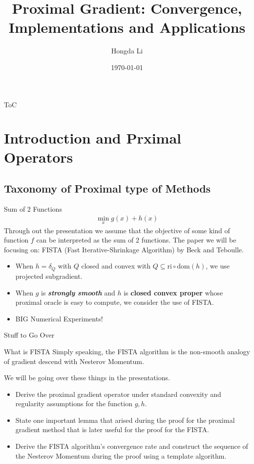 \documentclass[11pt]{beamer}
\author{Hongda Li}
\title{Proximal Gradient: Convergence, Implementations and Applications}
\institute[]{UBC Okanagan}
\date{\today}
\begin{document}
\begin{frame}
    \titlepage
\end{frame}

\begin{frame}{ToC}
    \tableofcontents
\end{frame}

\section{Introduction and Prximal Operators}
    \subsection{Taxonomy of Proximal type of Methods}
        \begin{frame}{Sum of 2 Functions}
            \begin{align}
                \min_{x} g(x) + h(x)
            \end{align}
            Through out the presentation we assume that the objective of some kind of function $f$ can be interpreted as the sum of 2 functions.
            The paper we will be focusing on: FISTA (Fast Iterative-Shrinkage Algorithm) by Beck and Teboulle. 
            \begin{itemize}
                \item [1.] When $h = \delta_Q$ with $Q$ closed and convex with $Q\subseteq \text{ri}\circ \text{dom}(h)$, we use projected subgradient. 
                \item [2.] When $g$ is \textbf{\emph{strongly smooth}} and $h$ is \textbf{closed convex proper} whose proximal oracle is easy to compute, we consider the use of FISTA. 
                \item [3.] BIG Numerical Experiments!
            \end{itemize}
        \end{frame}
        \begin{frame}{Stuff to Go Over}
            \begin{block}{What is FISTA}
                Simply speaking, the FISTA algorithm is the non-smooth analogy of gradient descend with Nesterov Momentum.     
            \end{block}
            We will be going over these things in the presentations. 
            \begin{itemize}
                \item [1.] Derive the proximal gradient operator under standard convexity and regularity assumptions for the function $g, h$. 
                \item [2.] State one important lemma that arised during the proof for the proximal gradient method that is later useful for the proof for the FISTA. 
                \item [3.] Derive the FISTA algorithm's convergence rate and construct the sequence of the Nesterov Momentum during the proof using a template algorithm. 
            \end{itemize}
        \end{frame}
\end{document}

